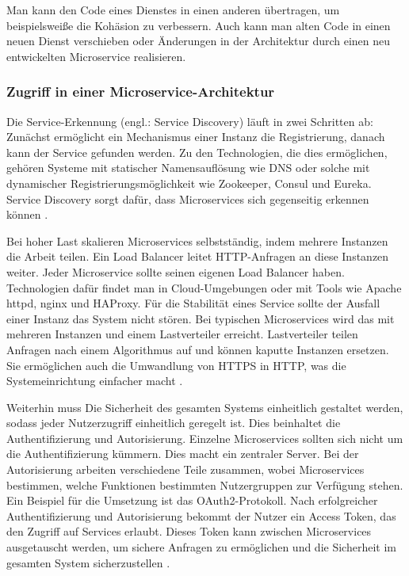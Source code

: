 {Man kann den Code eines Dienstes in einen anderen übertragen, um beispielsweiße die Kohäsion zu verbessern. Auch kann man alten Code in einen neuen Dienst verschieben oder Änderungen in der Architektur durch einen neu entwickelten Microservice realisieren.
\cite[S. 115-120]{wolff}

\subsubsection{Zugriff in einer Microservice-Architektur}

Die Service-Erkennung (engl.: Service Discovery) läuft in zwei Schritten ab: Zunächst ermöglicht ein Mechanismus einer Instanz die Registrierung, danach kann der Service gefunden werden. Zu den Technologien, die dies ermöglichen, gehören Systeme mit statischer Namensauflösung wie DNS oder solche mit dynamischer Registrierungsmöglichkeit wie Zookeeper, Consul und Eureka. Service Discovery sorgt dafür, dass Microservices sich gegenseitig erkennen können \cite[S.296-301]{newman} \cite[S. 143 - 146]{wolff} \cite[S.329]{daschner}.

Bei hoher Last skalieren Microservices selbstständig, indem mehrere Instanzen die Arbeit teilen. Ein Load Balancer leitet HTTP-Anfragen an diese Instanzen weiter. Jeder Microservice sollte seinen eigenen Load Balancer haben. Technologien dafür findet man in Cloud-Umgebungen oder mit Tools wie Apache httpd, nginx und HAProxy. Für die Stabilität eines Service sollte der Ausfall einer Instanz das System nicht stören. Bei typischen Microservices wird das mit mehreren Instanzen und einem Lastverteiler erreicht. Lastverteiler teilen Anfragen nach einem Algorithmus auf und können kaputte Instanzen ersetzen. Sie ermöglichen auch die Umwandlung von HTTPS in HTTP, was die Systemeinrichtung einfacher macht \cite[S. 147 - 150]{wolff} \cite[S.274-275]{newman}.

Weiterhin muss Die Sicherheit des gesamten Systems einheitlich gestaltet werden, sodass jeder Nutzerzugriff einheitlich geregelt ist. Dies beinhaltet die Authentifizierung und Autorisierung. Einzelne Microservices sollten sich nicht um die Authentifizierung kümmern. Dies macht ein zentraler Server. Bei der Autorisierung arbeiten verschiedene Teile zusammen, wobei Microservices bestimmen, welche Funktionen bestimmten Nutzergruppen zur Verfügung stehen. Ein Beispiel für die Umsetzung ist das OAuth2-Protokoll. Nach erfolgreicher Authentifizierung und Autorisierung bekommt der Nutzer ein Access Token, das den Zugriff auf Services erlaubt. Dieses Token kann zwischen Microservices ausgetauscht werden, um sichere Anfragen zu ermöglichen und die Sicherheit im gesamten System sicherzustellen \cite[S. 153-161]{wolff}.


}
